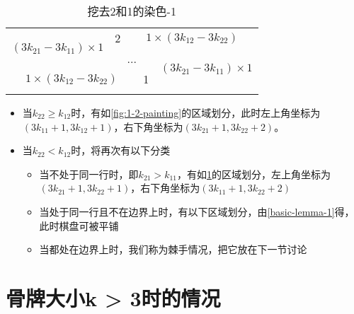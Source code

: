 \begin{table}[t]
	\centering
	\caption{挖去2和1的染色-1}
	\begin{tabular}{|cc|ccc|cc|}
		\hline
		\multicolumn{2}{|c|}{\multirow{3}{*}{$(3k_{21} - 3k_{11}) \times 1$}} & 2 & \multicolumn{4}{|c|}{$1 \times  (3k_{12} - 3k_{22})$}                                                                                 \\
		\cline{3-7}
																			  &   & \multicolumn{3}{|c|}{\multirow{2}{*}{...}}            & \multicolumn{2}{|c|}{\multirow{3}{*}{$(3k_{21} - 3k_{11}) \times 1$}}         \\
																			  &   &                                                       &                                                                       &  &  & \\
		\cline{1-5}
		\multicolumn{4}{|c|}{$1 \times  (3k_{12} - 3k_{22})$}                 & 1 &                                                       &                                                                               \\
		\hline
	\label{fig:2-1-painting-1}
	\end{tabular}
\end{table}

\begin{itemize}
	\item 当$k_{22} \ge k_{12}$时，有如\ref*{fig:1-2-painting}的区域划分，此时左上角坐标为$(3k_{11} + 1, 3k_{12} + 1)$，右下角坐标为$(3k_{21} + 1, 3k_{22} + 2)$。
	\item 当$k_{22} < k_{12}$时，将再次有以下分类
	      \begin{itemize}
		      \item 当不处于同一行时，即$k_{21} > k_{11}$，有如\ref*{fig:2-1-painting-1}的区域划分，左上角坐标为$(3k_{21} + 1, 3k_{22} + 1)$，右下角坐标为$(3k_{11} + 1, 3k_{22} + 2)$
		      \item 当处于同一行且不在边界上时，有以下区域划分，由\ref*{basic-lemma-1}得，此时棋盘可被平铺
		      \item 当都处在边界上时，我们称为棘手情况，把它放在下一节讨论
	      \end{itemize}
\end{itemize}



\section{骨牌大小k > 3时的情况}

